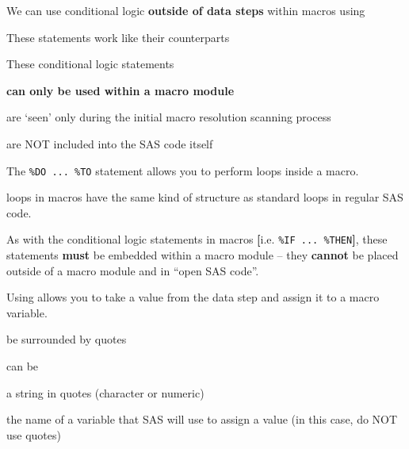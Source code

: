\begin{frame}
\bi
\item We can use conditional logic \textbf{outside of data steps} within macros using 
\item These statements work like their counterparts 
\item These conditional logic statements
	\bi
	\item \textbf{can only be used within a macro module }
	\item are `seen' only during the initial macro resolution scanning process
	\item are NOT included into the SAS code itself
	\ei
\ei
\end{frame}

\begin{frame}[fragile]
\bi
\item The \verb|%DO ... %TO| statement allows you to perform loops inside a macro. \\
\item {} loops in macros have the same kind of structure as standard  loops in regular SAS code.\\
\item As with the conditional logic statements in macros \textbf{[}i.e. \verb|%IF ... %THEN|\textbf{]}, these statements \textbf{must} be embedded within a macro module -- they \textbf{cannot}  be placed outside of a macro module and in ``open SAS code''.\\
\ei
\end{frame}

\begin{frame}
Using  allows you to take a value from the data step and assign it to a macro variable.
\begin{center}
\end{center}
	\bi
	\item {}  be surrounded by quotes
	\item {} can be
    \bi
    \item a string in quotes (character or numeric)
    \item the name of a variable that SAS will use to assign a value (in this case, do NOT use quotes)
	\ei
\ei
\end{frame}

